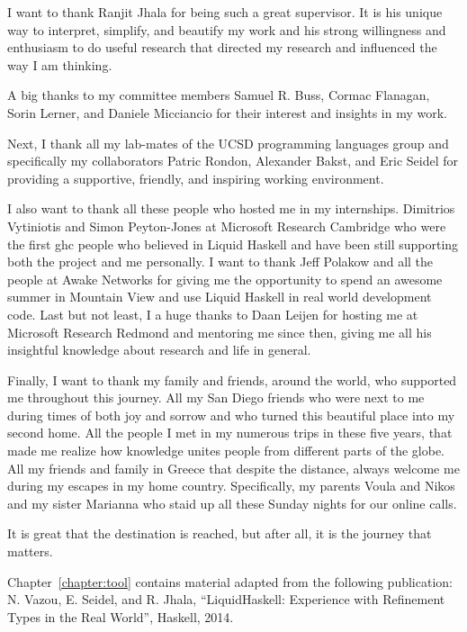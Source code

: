 I want to thank Ranjit Jhala for being such a great supervisor. 
%
It is his unique way to interpret, simplify, and beautify my 
work
and his strong willingness and enthusiasm to do useful research 
that directed my research and influenced the way I am thinking. 

A big thanks to my committee members 
Samuel R. Buss, 
Cormac Flanagan,
Sorin Lerner, 
and Daniele Micciancio for their interest and insights in my work. 

Next, I thank all my lab-mates of the UCSD programming languages group and specifically my 
collaborators
Patric Rondon,
Alexander Bakst, and
Eric Seidel 
for providing a supportive, friendly, and inspiring working environment.

I also want to thank all these people who hosted me in my internships. 
%
%
Dimitrios Vytiniotis and Simon Peyton-Jones
at Microsoft Research Cambridge
who were the first ghc people who believed in Liquid Haskell
and have been still supporting both the project and me personally.
%
I want to thank Jeff Polakow and all the people at Awake Networks 
for giving me the opportunity to spend an awesome summer in Mountain View 
and use Liquid Haskell in real world development code. 
%
Last but not least, 
I a huge thanks to Daan Leijen 
for hosting me at Microsoft Research Redmond 
and mentoring me since then, giving me all his insightful
knowledge about research and life in general.

Finally, I want to thank my family and friends, around the world,
who supported me throughout this journey.
%
All my San Diego friends who were next to me 
during times of both joy and sorrow and 
who turned this beautiful place into 
my second home.
%
All the people I met in my numerous trips in these five years, 
that made me realize how knowledge unites people from different parts of the globe.
%
All my friends and family in Greece that despite the distance, 
always welcome me during my escapes in my home country. 
%
Specifically, my parents Voula and Nikos and my sister Marianna
who staid up all these Sunday nights for our online calls. 

It is great that the destination is reached, 
but after all, it is the journey that matters. 

\newpage

Chapter~\ref{chapter:tool} contains material adapted from the following publication:
\noindent N. Vazou, E. Seidel, and R. Jhala,
``LiquidHaskell: Experience with Refinement Types in the Real World'', 
Haskell, 2014.

